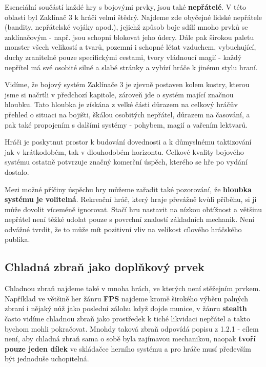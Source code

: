 Esenciální součástí každé hry s bojovými prvky, jsou také \textbf{nepřátelé}. V této oblasti byl Zaklínač 3 k hráči velmi štědrý. Najdeme zde obyčejné lidské nepřátele (bandity, nepřátelské vojáky apod.), jejichž způsob boje sdílí mnoho prvků se zaklínačovým - např. jsou schopni blokovat jeho údery. Dále pak širokou paletu monster všech velikostí a tvarů, pozemní i schopné létat vzduchem, vybuchující, duchy zranitelné pouze specifickými cestami, tvory vládnoucí magií - každý nepřítel má své osobité silné a slabé stránky a vybízí hráče k jinému stylu hraní.

\bigbreak

Vidíme, že bojový systém Zaklínače 3 je zjevně postaven kolem kostry, kterou jsme si načrtli v předchozí kapitole, zároveň jde o systém mající značnou hloubku. Tato hloubka je získána z velké části důrazem na celkový hráčův přehled o situaci na bojišti, škálou osobitých nepřátel, důrazem na časování, a pak také propojením s dalšími systémy - pohybem, magií a vařením lektvarů. 

Hráči je poskytnut prostor k budování dovednosti a k důmyslnému taktizování jak v krátkodobém, tak v dlouhodobém horizontu. Celkové kvality bojového systému ostatně potvrzuje značný komerční úspěch, kterého se hře po vydání dostalo.

Mezi možné příčiny úspěchu hry můžeme zařadit také pozorování, že \textbf{hloubka systému je volitelná}. Rekreační hráč, který hraje převážně kvůli příběhu, si ji může dovolit víceméně ignorovat. Stačí hru nastavit na nízkou obtížnost a většinu nepřátel není těžké udolat pouze s povrchní znalostí základních mechanik. Není odvážné tvrdit, že to může mít pozitivní vliv na velikost cílového hráčského publika. 

\subsection{Chladná zbraň jako doplňkový prvek}

Chladnou zbraň najdeme také v mnoha hrách, ve kterých není stěžejním prvkem. Například ve většině her žánru \textbf{\acs{FPS}} najdeme kromě širokého výběru palných zbraní i nějaký nůž jako poslední zálohu když dojde munice, v žánru \textbf{stealth} často vidíme chladnou zbraň jako prostředek k tiché likvidaci nepřátel a takto bychom mohli pokračovat. Mnohdy taková zbraň odpovídá popisu z 1.2.1 - cílem není, aby chladná zbraň sama o sobě byla zajímavou mechanikou, naopak \textbf{tvoří pouze jeden dílek} ve skládačce herního systému a pro hráče musí především být jednoduše uchopitelná. 

